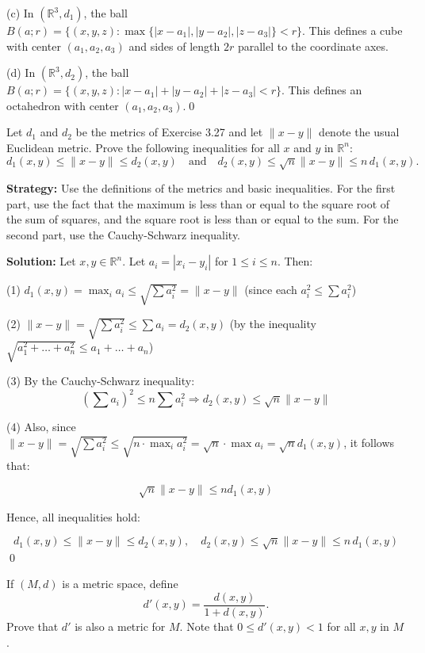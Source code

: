 (c) In $(\mathbb{R}^3, d_1)$, the ball $B(a;r) = \{(x,y,z) : \max\{|x-a_1|, |y-a_2|, |z-a_3|\} < r\}$. This defines a cube with center $(a_1,a_2,a_3)$ and sides of length $2r$ parallel to the coordinate axes.

(d) In $(\mathbb{R}^3, d_2)$, the ball $B(a;r) = \{(x,y,z) : |x-a_1| + |y-a_2| + |z-a_3| < r\}$. This defines an octahedron with center $(a_1,a_2,a_3)$.\qed


\begin{problembox}
\begin{problemstatement}
Let \( d_1 \) and \( d_2 \) be the metrics of Exercise 3.27 and let \( \|x - y\| \) denote the usual Euclidean metric. Prove the following inequalities for all \( x \) and \( y \) in \( \mathbb{R}^n \):
\[d_1(x, y) \leq \|x - y\| \leq d_2(x, y) \quad \text{and} \quad d_2(x, y) \leq \sqrt{n} \|x - y\| \leq n\,d_1(x, y).\]
\end{problemstatement}
\end{problembox}

\noindent\textbf{Strategy:} Use the definitions of the metrics and basic inequalities. For the first part, use the fact that the maximum is less than or equal to the square root of the sum of squares, and the square root is less than or equal to the sum. For the second part, use the Cauchy-Schwarz inequality.

\bigskip\noindent\textbf{Solution:} Let $x, y \in \mathbb{R}^n$. Let $a_i = |x_i - y_i|$ for $1 \leq i \leq n$. Then:

(1) \( d_1(x, y) = \max_i a_i \leq \sqrt{\sum a_i^2} = \|x - y\| \) (since each $a_i^2 \leq \sum a_i^2$)

(2) \( \|x - y\| = \sqrt{\sum a_i^2} \leq \sum a_i = d_2(x,y) \) (by the inequality \( \sqrt{a_1^2 + \dots + a_n^2} \leq a_1 + \dots + a_n \))

(3) By the Cauchy-Schwarz inequality:
\[
\left(\sum a_i\right)^2 \leq n \sum a_i^2 \Rightarrow d_2(x,y) \leq \sqrt{n} \|x - y\|
\]

(4) Also, since \( \|x - y\| = \sqrt{\sum a_i^2} \leq \sqrt{n \cdot \max_i a_i^2} = \sqrt{n} \cdot \max a_i = \sqrt{n} d_1(x, y) \), it follows that:

\[
\sqrt{n} \|x - y\| \leq n d_1(x, y)
\]

Hence, all inequalities hold:

\[
d_1(x,y) \leq \|x - y\| \leq d_2(x,y), \quad d_2(x, y) \leq \sqrt{n} \|x - y\| \leq n\,d_1(x, y)
\]\qed


\begin{problembox}
\begin{problemstatement}
If \( (M, d) \) is a metric space, define
\[d'(x, y) = \frac{d(x, y)}{1 + d(x, y)}.\]
Prove that \( d' \) is also a metric for \( M \). Note that \( 0 \leq d'(x, y) < 1 \) for all \( x, y \) in \( M \).
\end{problemstatement}
\end{problembox}

